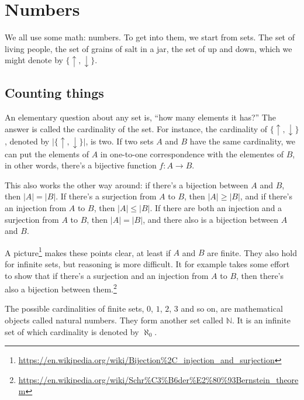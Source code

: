 \documentclass[11pt,oneside,%
]{memoir}
\theoremstyle{definition}
\newcommand{\NN}{\mathbb{N}}
\newcommand{\RR}{\mathbb{R}}
\newcommand{\CC}{\mathbb{C}}
\newcommand{\ZZ}{\mathbb{Z}}
\newcommand{\QQ}{\mathbb{Q}}
\begin{document}
\chapter{Numbers}

We all use some math: numbers. To get into them, we start from sets. The set of living people, the set of grains of salt in a jar, the set of up and down, which we might denote by \(\lbrace\uparrow,\downarrow\rbrace\). %

\section{Counting things}

An elementary question about any set is, ``how many elements it has?'' The answer is called the cardinality of the set. For instance, the cardinality of \(\lbrace\uparrow,\downarrow\rbrace\), denoted by \(|\lbrace\uparrow,\downarrow\rbrace|\), is two. If two sets \(A\) and \(B\) have the same cardinality, we can put the elements of \(A\) in one-to-one correspondence with the elementes of \(B\), in other words, there's a bijective function \(f:A\rightarrow B\). %

This also works the other way around: if there's a bijection between \(A\) and \(B\), then \(|A|=|B|\). If there's a surjection from \(A\) to \(B\), then \(|A|\geq|B|\), and if there's an injection from \(A\) to \(B\), then \(|A|\leq|B|\). If there are both an injection and a surjection from \(A\) to \(B\), then \(|A|=|B|\), and there also is a bijection between \(A\) and \(B\).

A picture\footnote{\url{https://en.wikipedia.org/wiki/Bijection\%2C_injection_and_surjection}} makes these points clear, at least if \(A\) and \(B\) are finite. They also hold for infinite sets, but reasoning is more difficult. It for example takes some effort to show that if there's a surjection and an injection from \(A\) to \(B\), then there's also a bijection between them.\footnote{\url{https://en.wikipedia.org/wiki/Schr\%C3\%B6der\%E2\%80\%93Bernstein_theorem}}

The possible cardinalities of finite sets, \(0\), \(1\), \(2\), \(3\) and so on, are mathematical objects called natural numbers. They form another set called \(\NN\). It is an infinite set of which cardinality is denoted by \(\aleph_0\).
\end{document}
